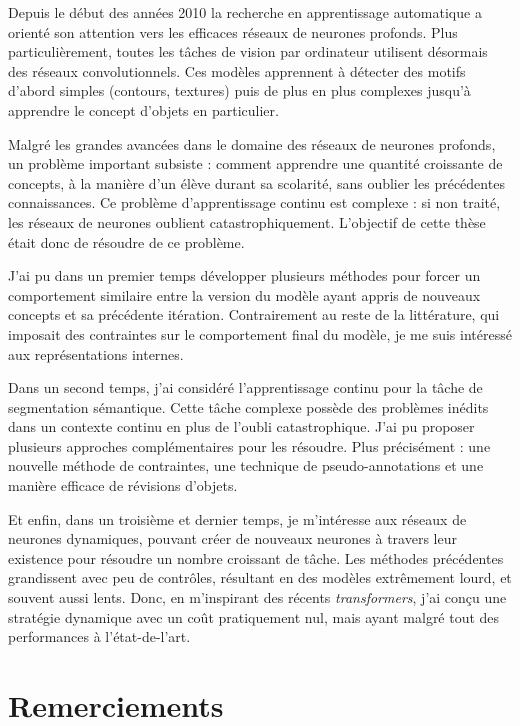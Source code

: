 
Depuis le début des années 2010 la recherche en apprentissage automatique a orienté son attention
vers les efficaces réseaux de neurones profonds. Plus particulièrement, toutes les tâches de vision
par ordinateur utilisent désormais des réseaux convolutionnels. Ces modèles apprennent à détecter
des motifs d'abord simples (contours, textures) puis de plus en plus complexes jusqu'à apprendre
le concept d'objets en particulier.

Malgré les grandes avancées dans le domaine des réseaux de neurones profonds, un problème important
subsiste : comment apprendre une quantité croissante de concepts, à la manière d'un élève durant sa
scolarité, sans oublier les précédentes connaissances. Ce problème d'apprentissage continu est
complexe : si non traité, les réseaux de neurones oublient catastrophiquement. L'objectif de cette
thèse était donc de résoudre de ce problème.

J'ai pu dans un premier temps développer plusieurs méthodes pour forcer un comportement similaire
entre la version du modèle ayant appris de nouveaux concepts et sa précédente itération.
Contrairement au reste de la littérature, qui imposait des contraintes sur le comportement final du
modèle, je me suis intéressé aux représentations internes.

Dans un second temps, j'ai considéré l'apprentissage continu pour la tâche de segmentation
sémantique. Cette tâche complexe possède des problèmes inédits dans un contexte continu en plus de
l'oubli catastrophique. J'ai pu proposer plusieurs approches complémentaires pour les résoudre. Plus
précisément : une nouvelle méthode de contraintes, une technique de pseudo-annotations et une
manière efficace de révisions d'objets.

Et enfin, dans un troisième et dernier temps, je m'intéresse aux réseaux de neurones dynamiques,
pouvant créer de nouveaux neurones à travers leur existence pour résoudre un nombre croissant de
tâche. Les méthodes précédentes grandissent avec peu de contrôles, résultant en des modèles
extrêmement lourd, et souvent aussi lents. Donc, en m'inspirant des récents \textit{transformers},
j'ai conçu une stratégie dynamique avec un coût pratiquement nul, mais ayant malgré tout des
performances à l'état-de-l'art.


\cleardoublepage
\chapter{Remerciements}


